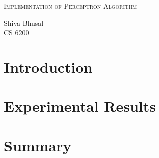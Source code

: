 \documentclass[letterpaper]{article}
\newcommand{\reporttitle}{Implementation of Perceptron Algorithm}
\newcommand{\name}{Shiva Bhusal}
\newcommand{\course}{CS 6200}
\begin{document}
\begin{center}{\huge \scshape \reporttitle}\end{center}
\begin{center}\vspace{0.2em} {\Large \name\\}
  {\course}\end{center}
  
  
  \section{Introduction}

  \section {Experimental Results}

  \section {Summary}
  
\end{document}
